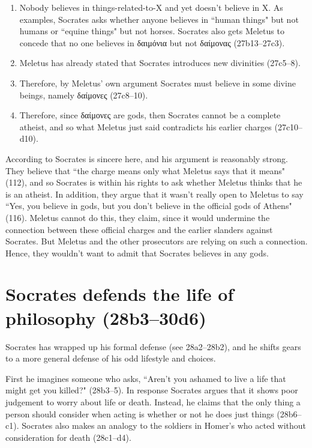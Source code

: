 \documentclass[11pt]{article}
\begin{document}
\begin{enumerate}
    \item Nobody believes in things-related-to-X and yet doesn't believe in X.  As examples, Socrates asks whether anyone believes in ``human things" but not humans or ``equine things" but not horses.  Socrates also gets Meletus to concede that no one believes in δαιμόνια but not δαίμονας (27b13--27c3).
    \item Meletus has already stated that Socrates introduces new divinities (27c5--8).
    \item Therefore, by Meletus' own argument Socrates must believe in some divine beings, namely δαίμονες (27c8--10).
    \item Therefore, since δαίμονες are gods, then Socrates cannot be a complete atheist, and so what Meletus just said contradicts his earlier charges (27c10--d10).
\end{enumerate}

According to \citeauthor{brickhouse2004} Socrates is sincere here, and his argument is reasonably strong.  They believe that ``the charge means only what Meletus says that it means" (112), and so Socrates is within his rights to ask whether Meletus thinks that he is an atheist.  In addition, they argue that it wasn't really open to Meletus to say ``Yes, you believe in gods, but you don't believe in the official gods of Athens" (116).  Meletus cannot do this, they claim, since it would undermine the connection between these official charges and the earlier slanders against Socrates.  But Meletus and the other prosecutors are relying on such a connection.  Hence, they wouldn't want to admit that Socrates believes in any gods.


\section{Socrates defends the life of philosophy (28b3--30d6)}

Socrates has wrapped up his formal defense (see 28a2--28b2), and he shifts gears to a more general defense of his odd lifestyle and choices.

First he imagines someone who asks, ``Aren't you ashamed to live a life that might get you killed?" (28b3--5).  In response Socrates argues that it shows poor judgement to worry about life or death. Instead, he claims that the only thing a person should consider when acting is whether or not he does just things (28b6--c1).  Socrates also makes an analogy to the soldiers in Homer's  who acted without consideration for death (28c1--d4).
\end{document}

